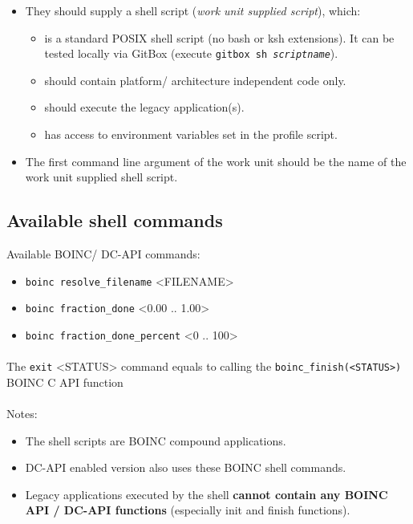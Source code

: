 \documentclass[a4paper,12pt,titlepage,dvipdfm]{article}
\begin{document}
\begin{itemize}
    \item They should supply a shell script (\emph{work unit supplied script}), which:
        \begin{itemize}
            \item is a standard POSIX shell script (no bash or ksh extensions). It can be tested locally via GitBox (execute \texttt{gitbox sh \emph{scriptname}}).
            \item should contain platform/ architecture independent code only.
            \item should execute the legacy application(s).
            \item has access to environment variables set in the profile script.
        \end{itemize}
    \item The first command line argument of the work unit should be the name of the work unit supplied shell script.
\end{itemize}

\subsection{Available shell commands}

Available BOINC/ DC-API commands:
\begin{itemize}
    \item \texttt{boinc resolve\_filename} <FILENAME>
    \item \texttt{boinc fraction\_done} <0.00 .. 1.00>
    \item \texttt{boinc fraction\_done\_percent} <0 .. 100>
\end{itemize}

\paragraph*{} The \texttt{exit} <STATUS> command equals to calling the \texttt{boinc\_finish(<STATUS>)} BOINC C API function

\paragraph*{} Notes:
\begin{itemize}
    \item The shell scripts are BOINC compound applications. 
    \item DC-API enabled version also uses these BOINC shell commands.
    \item Legacy applications executed by the shell \textbf{cannot contain any BOINC API / DC-API functions} (especially init and finish functions).
     
\end{itemize}
\end{document}
